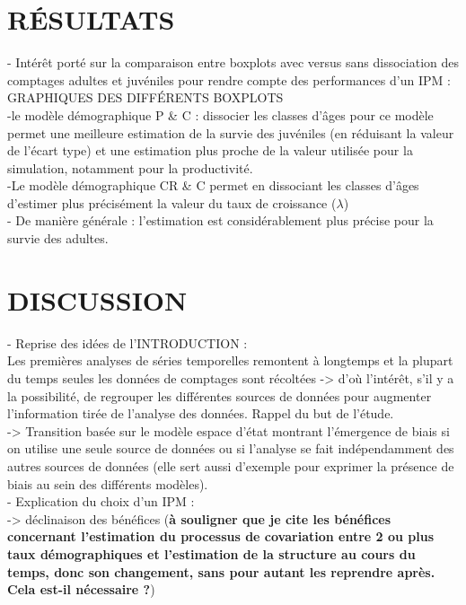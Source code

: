 \documentclass[12pt,a4paper]{article}
\begin{document}
\section{RÉSULTATS}
- Intérêt porté sur la comparaison entre boxplots avec versus sans dissociation des comptages adultes et juvéniles pour rendre compte des performances d'un IPM :\\
GRAPHIQUES DES DIFFÉRENTS BOXPLOTS\\
-le modèle démographique P \& C : dissocier les classes d'âges pour ce modèle permet une meilleure estimation de la survie des juvéniles (en réduisant la valeur de l'écart type) et une estimation plus proche de la valeur utilisée pour la simulation, notamment pour la productivité.\\
-Le modèle démographique CR \& C permet en dissociant les classes d'âges d'estimer plus précisément la valeur du taux de croissance ($\lambda$) \\
- De manière générale : l'estimation est considérablement plus précise pour la survie des adultes.\\

\section{DISCUSSION}
- Reprise des idées de l'INTRODUCTION : \\
Les premières analyses de séries temporelles remontent à longtemps et la plupart du temps seules les données de comptages sont récoltées -> d'où l'intérêt, s'il y a la possibilité, de regrouper les différentes sources de données pour augmenter l'information tirée de l'analyse des données. Rappel du but de l'étude.\\

-> Transition basée sur le modèle espace d'état montrant l'émergence de biais si on utilise une seule source de données ou si l'analyse se fait indépendamment des autres sources de données (elle sert aussi d'exemple pour exprimer la présence de biais au sein des différents modèles).\\

- Explication du choix d'un IPM :\\
-> déclinaison des bénéfices (\textbf{à souligner que je cite les bénéfices concernant l'estimation du processus de covariation entre 2 ou plus taux démographiques et l'estimation de la structure au cours du temps, donc son changement, sans pour autant les reprendre après. Cela est-il nécessaire ?})\\
\end{document}
